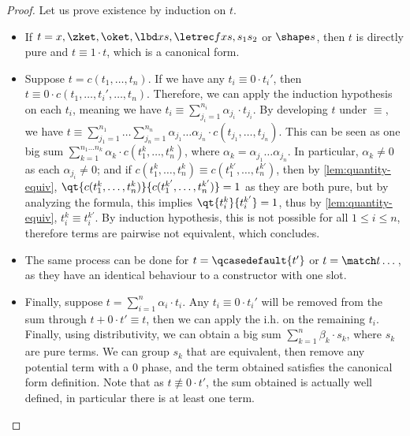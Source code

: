\begin{proof}
  Let us prove existence by induction on $t$.

  \begin{itemize}
    \item If $t = x, \zket, \oket, \lbd x s, \letrec f x s, s_1 s_2$ or $\shape
      s$, then $t$ is directly pure and $t \equiv 1 \cdot t$, which is a
      canonical form.
    \item Suppose $t = c(t_1, \dots, t_n)$. If we have any $t_i
      \equiv 0 \cdot t_i'$, then $t \equiv 0 \cdot c(t_1, \dots,
      t_i', \dots, t_n)$.
      Therefore, we can apply the induction hypothesis on each $t_i$,
      meaning we have $t_i \equiv \sum_{j_i = 1}^{n_i} \alpha_{j_i}
      \cdot t_{j_i}$.
      By developing $t$ under $\equiv$, we have $t \equiv
      \sum_{j_1=1}^{n_1} \dots \sum_{j_n=1}^{n_n} \alpha_{j_1} \dots
      \alpha_{j_n} \cdot c(t_{j_1}, \dots, t_{j_n})$.
      This can be seen as one big sum $\sum_{k=1}^{n_1 \dots n_k}
      \alpha_k \cdot c(t_1^k, \dots, t_n^k)$, where $\alpha_k =
      \alpha_{j_1} \dots \alpha_{j_n}$.
      In particular, $\alpha_k \neq 0$ as each $\alpha_{j_i} \neq 0$;
      and if $c(t_1^k, \dots, t_n^k) \equiv c(t_1^{k'}, \dots,
      t_n^{k'})$, then by \autoref{lem:quantity-equiv},
      $\qt {c(t_1^k, \dots, t_n^k)} {c(t_1^{k'}, \dots, t_n^{k'})} =
      1$ as they are both pure,
      but by analyzing the formula, this implies $\qt {t_i^k}
      {t_i^{k'}} = 1$, thus by \autoref{lem:quantity-equiv}, $t_i^k
      \equiv t_i^{k'}$.
      By induction hypothesis, this is not possible for all $1 \leq i
      \leq n$, therefore terms are pairwise not equivalent, which concludes.
    \item The same process can be done for $t = \qcasedefault{t'}$ or $t
      = \match t \dots$, as they have an identical behaviour to a
      constructor with one slot.
    \item Finally, suppose $t = \sum_{i=1}^n \alpha_i \cdot t_i$.
      Any $t_i \equiv 0 \cdot t_i'$ will be removed from the sum
      through $t + 0 \cdot t' \equiv t$, then we can apply the i.h.
      on the remaining $t_i$.
      Finally, using distributivity, we can obtain a big sum
      $\sum_{k=1}^n \beta_k \cdot s_k$, where $s_k$ are pure terms.
      We can group $s_k$ that are equivalent, then remove any
      potential term with a $0$ phase, and the term obtained
      satisfies the canonical form definition.
      Note that as $t \not\equiv 0 \cdot t'$, the sum obtained is
      actually well defined, in particular there is at least one term.
  \end{itemize}


\end{proof}
